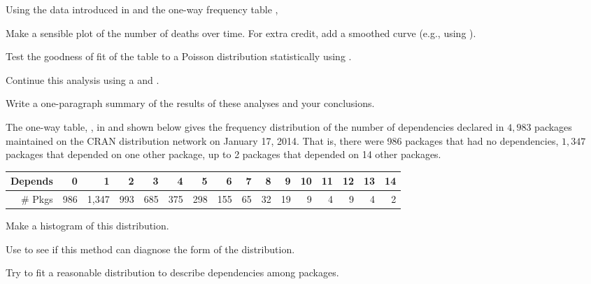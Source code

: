 \documentclass[10pt,krantz2]{krantz}\usepackage[]{graphicx}\usepackage[]{color}
\begin{document}
\begin{Exercises}
\exercise Using the data  introduced in 
and the one-way frequency table ,
  \begin{itemize*}
    \item Make a sensible plot of the number of deaths over time. For extra credit,
    add a smoothed curve (e.g., using ).
    \item Test the goodness of fit of the table  to
    a Poisson distribution statistically using .
    \item Continue this analysis using a  and .
    \item Write a one-paragraph summary of the results of these analyses and your
    conclusions.
  \end{itemize*}

\exercise\hard
  The one-way table, , in  and shown below gives the frequency
  distribution of the number of dependencies declared in $4,983$ \R packages
  maintained on the CRAN distribution network on January 17, 2014. That is, there were 986
  packages that had no dependencies, $1,347$ packages that depended on one other package,
  up to 2 packages that depended on 14 other packages.

\begin{table}[ht]
\centering
\begin{tabular}{rrrrrrrrrrrrrrrr}
  \hline
Depends & 0 & 1 & 2 & 3 & 4 & 5 & 6 & 7 & 8 & 9 & 10 & 11 & 12 & 13 & 14 \\
  \hline
\# Pkgs & 986 & 1,347 & 993 & 685 & 375 & 298 & 155 &  65 &  32 &  19 &   9 &   4 &   9 &   4 &   2 \\
   \hline
\end{tabular}
\end{table}

    \begin{enumerate*}
      \item Make a histogram of this distribution.
      \item Use  to see if this method can diagnose the form of the distribution.
      \item Try to fit a reasonable distribution to describe dependencies among \R packages.
    \end{enumerate*}


\end{Exercises}
\end{document}
